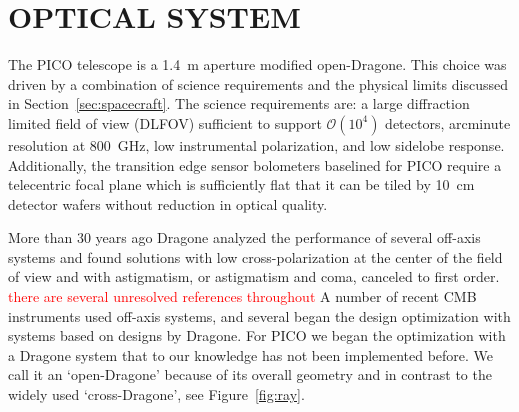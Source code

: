 \documentclass[]{spie}  %
\newcommand{\comr}[1]{\textcolor{red}{#1}}
\begin{document}
\section{OPTICAL SYSTEM}
\label{sec:optics}

The PICO telescope is a 1.4~m aperture modified open-Dragone.  This choice was driven by a combination of science
requirements and the physical limits discussed in Section~\ref{sec:spacecraft}.  The science requirements are: a large diffraction 
limited field of view (DLFOV) sufficient to support $\mathcal{O}(10^4)$ detectors, arcminute resolution at 800~GHz, low 
instrumental polarization, and low sidelobe response. Additionally, 
the transition edge sensor bolometers baselined for PICO require a telecentric focal plane which is sufficiently flat that it 
can be tiled by 10~cm detector wafers without reduction in optical quality. 

More than 30 years ago Dragone analyzed the 
performance of several off-axis systems and found solutions with low cross-polarization at the center of the field 
of view and with astigmatism, or astigmatism and coma, canceled to first order.\cite{dragone,dragone_coma,dragone1983} 
\comr{there are several unresolved references throughout}
A number of recent CMB instruments used off-axis systems, and several 
began the design optimization with systems based on designs by
Dragone\cite{planck2000_optics,ACT2011_optics,SPT2008_optics,core2018_inst,LB2016_optics,parshley_ccat_spie}. 
For PICO we began 
the optimization with a Dragone system that to our knowledge has not been implemented before. 
We call it an `open-Dragone' because of its overall geometry and in contrast to the widely 
used `cross-Dragone', see Figure~\ref{fig:ray}. 

\end{document}
